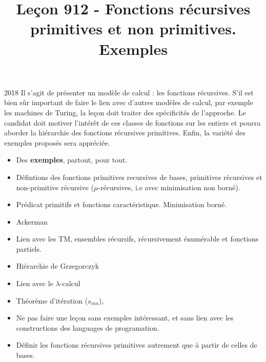 \documentclass{agregfiche}
\title{Leçon 912 - Fonctions récursives primitives et non primitives. Exemples}
\begin{document}
\maketitle

\secrapports
\begin{rapport}{2018}
	Il s’agit de présenter un modèle de calcul : les fonctions récursives. S’il est bien sûr important de faire
	le lien avec d’autres modèles de calcul, par exemple les machines de Turing, la leçon doit traiter des
	spécificités de l’approche. Le candidat doit motiver l’intérêt de ces classes de fonctions sur les entiers et
	pourra aborder la hiérarchie des fonctions récursives primitives. Enfin, la variété des exemples proposés
	sera appréciée.
\end{rapport}

\secindispensables

\begin{itemize}
	\item Des \textbf{exemples}, partout, pour tout. 
	\item Défintions des fonctions primitives recursives de bases, primitives récursives et non-primitive récursive ($\mu$-récursives, i.e avec minimisation non borné).
	\item Prédicat primitifs et fonctions caractéristique. Minimisation borné.
    \item Ackerman
    \item Lien avec les TM, ensembles récursifs, récursivement énumérable et fonctions partiels.
\end{itemize}

\secidees

\begin{itemize}

	\item Hiérarchie de Grzegorczyk
	\item Lien avec le $\lambda$-calcul
	\item Théorème d'itération ($s_{mn}$),
\end{itemize}

\secpieges

\begin{itemize}
	\item Ne pas faire une leçon sans exemples intéressant, et sans lien avec les constructions des languages de programation.
	\item Définir les fonctions récursives primitives autrement que à partir de celles de bases.
\end{itemize}
\end{document}
